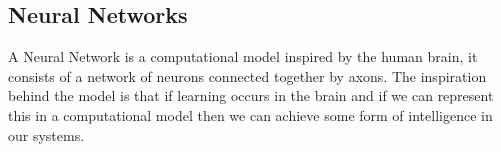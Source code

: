\documentclass[a4paper,12pt]{report}
\begin{document}
		\subsection{Neural Networks}
			A Neural Network is a computational model inspired by the human brain, it consists of a network of neurons connected together by axons. The inspiration behind the model is that if learning occurs in the brain and if we can represent this in a computational model then we can achieve some form of intelligence in our systems.
\end{document}
